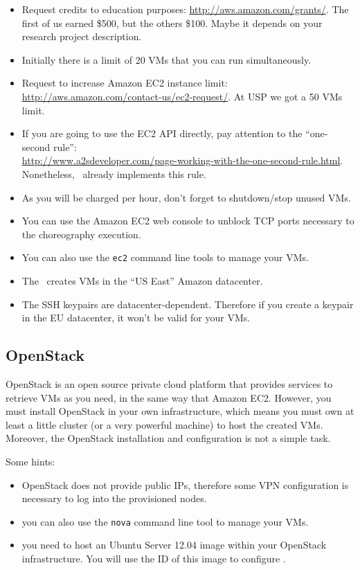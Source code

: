 \begin{itemize}
\item Request credits to education purposes: \url{http://aws.amazon.com/grants/}. The first of us earned \$500, but the others \$100. Maybe it depends on your research project description.
\item Initially there is a limit of 20 VMs that you can run simultaneously.
\item Request to increase Amazon EC2 instance limit: \url{http://aws.amazon.com/contact-us/ec2-request/}. At USP we got a 50 VMs limit.
\item If you are going to use the EC2 API directly, pay attention to the ``one-second rule'': \\ \url{http://www.a2sdeveloper.com/page-working-with-the-one-second-rule.html}. Nonetheless, \ee\ already implements this rule.
\item As you will be charged per hour, don't forget to shutdown/stop unused VMs.
\item You can use the Amazon EC2 web console to unblock TCP ports necessary to the choreography execution.
\item You can also use the \texttt{ec2} command line tools to manage your VMs.
\item The \ee\ creates VMs in the ``US East'' Amazon datacenter.
\item The SSH keypairs are datacenter-dependent. Therefore if you create a keypair in the EU
datacenter, it won't be valid for your VMs.
\end{itemize}

\subsection{OpenStack}

OpenStack is an open source private cloud platform that provides services to retrieve VMs as you need, in the same way that Amazon EC2. However, you must install OpenStack in your own infrastructure, which means you must own at least a little cluster (or a very powerful machine) to host the created VMs. Moreover, the OpenStack installation and configuration is not a simple task.

Some hints:

\begin{itemize}
\item OpenStack does not provide public IPs, therefore some VPN configuration is necessary to log into the provisioned nodes.
\item you can also use the \texttt{nova} command line tool to manage your VMs.
\item you need to host an Ubuntu Server 12.04 image within your OpenStack infrastructure. You will use the ID of this image to configure \ee.
\end{itemize}

